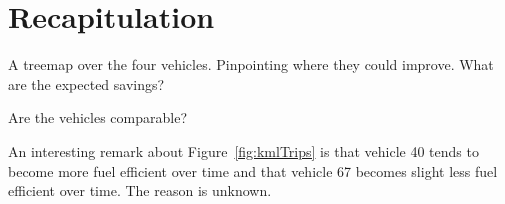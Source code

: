 \section{Recapitulation}
A treemap over the four vehicles.
Pinpointing where they could improve.
What are the expected savings?

Are the vehicles comparable?


An interesting remark about Figure~\ref{fig:kmlTrips} is that vehicle 40 tends to become more fuel efficient over time and that vehicle 67 becomes slight less fuel efficient over time. 
The reason is unknown.